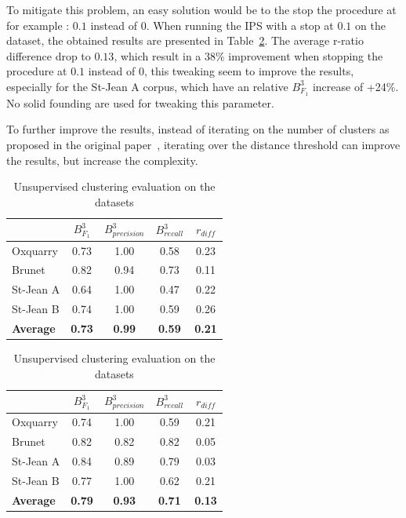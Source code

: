 To mitigate this problem, an easy solution would be to the stop the procedure at for example : $0.1$ instead of $0$.
When running the IPS with a stop at $0.1$ on the dataset, the obtained results are presented in Table~\ref{tab:unsupervised_clustering_01}.
The average r-ratio difference drop to $0.13$, which result in a 38\% improvement when stopping the procedure at $0.1$ instead of $0$, this tweaking seem to improve the results, especially for the St-Jean A corpus, which have an relative $B^3_{F_1}$ increase of +24\%.
No solid founding are used for tweaking this parameter.

To further improve the results, instead of iterating on the number of clusters as proposed in the original paper~\cite{automated_unsupervised}, iterating over the distance threshold can improve the results, but increase the complexity.

\begin{table}
  \centering
  \caption{Unsupervised clustering evaluation on the datasets}
  \label{tab:unsupervised_clustering}

  \label{tab:unsupervised_clustering_0}
  \begin{tabular}{l c c c c}
    \toprule
    &
    $B^3_{F_1}$ &
    $B^3_{precision}$  &
    $B^3_{recall}$  &
    $r_{diff}$ \\
    \midrule
    Oxquarry         & 0.73 & 1.00 & 0.58 & 0.23\\
    Brunet           & 0.82 & 0.94 & 0.73 & 0.11\\
    St-Jean A        & 0.64 & 1.00 & 0.47 & 0.22\\
    St-Jean B        & 0.74 & 1.00 & 0.59 & 0.26\\
    \textbf{Average} &
    \textbf{0.73} &
    \textbf{0.99} &
    \textbf{0.59} &
    \textbf{0.21} \\
    \bottomrule
  \end{tabular}

  \vspace{0.5cm}

  \label{tab:unsupervised_clustering_01}
  \begin{tabular}{l c c c c}
    \toprule
    &
    $B^3_{F_1}$ &
    $B^3_{precision}$  &
    $B^3_{recall}$  &
    $r_{diff}$ \\
    \midrule
    Oxquarry         & 0.74 & 1.00 & 0.59 & 0.21\\
    Brunet           & 0.82 & 0.82 & 0.82 & 0.05\\
    St-Jean A        & 0.84 & 0.89 & 0.79 & 0.03\\
    St-Jean B        & 0.77 & 1.00 & 0.62 & 0.21\\
    \textbf{Average} &
    \textbf{0.79} &
    \textbf{0.93} &
    \textbf{0.71} &
    \textbf{0.13} \\
    \bottomrule
  \end{tabular}
\end{table}

